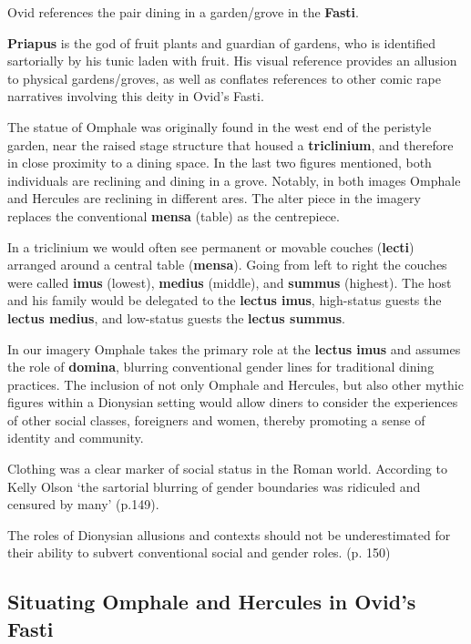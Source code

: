 Ovid references the pair dining in a garden/grove in the \textbf{Fasti}.

\begin{rmk}
    \textbf{Priapus} is the god of fruit plants and guardian of gardens, who is identified sartorially by his tunic laden with fruit. His visual reference provides an allusion to physical gardens/groves, as well as conflates references to other comic rape narratives involving this deity in Ovid's Fasti.
\end{rmk}

The statue of Omphale was originally found in the west end of the peristyle garden, near the raised stage structure that housed a \textbf{triclinium}, and therefore in close proximity to a dining space. In the last two figures mentioned, both individuals are reclining and dining in a grove. Notably, in both images Omphale and Hercules are reclining in different ares. The alter piece in the imagery replaces the conventional \textbf{mensa} (table) as the centrepiece.

In a triclinium we would often see permanent or movable couches (\textbf{lecti}) arranged around a central table (\textbf{mensa}). Going from left to right the couches were called \textbf{imus} (lowest), \textbf{medius} (middle), and \textbf{summus} (highest). The host and his family would be delegated to the \textbf{lectus imus}, high-status guests the \textbf{lectus medius}, and low-status guests the \textbf{lectus summus}.

In our imagery Omphale takes the primary role at the \textbf{lectus imus} and assumes the role of \textbf{domina}, blurring conventional gender lines for traditional dining practices. The inclusion of not only Omphale and Hercules, but also other mythic figures within a Dionysian setting would allow diners to consider the experiences of other social classes, foreigners and women, thereby promoting a sense of identity and community.

\begin{rmk}
    Clothing was a clear marker of social status in the Roman world. According to Kelly Olson `the sartorial blurring of gender boundaries was ridiculed and censured by many' (p.149).
\end{rmk}

The roles of Dionysian allusions and contexts should not be underestimated for their ability to subvert conventional social and gender roles. (p. 150)


\subsection{Situating Omphale and Hercules in Ovid's Fasti}


